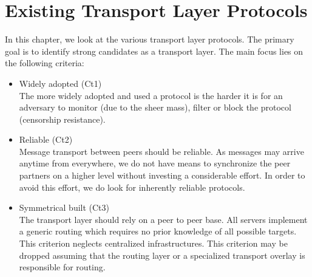 \chapter{Existing Transport Layer Protocols \label{sec:existingTPP}}
In this chapter, we look at the various transport layer protocols. The primary goal is to identify strong candidates as a transport layer. The main focus lies on the following criteria:
\begin{itemize}
	\item Widely adopted (Ct1)\\
	      The more widely adopted and used a protocol is the harder it is for an adversary to monitor (due to the sheer mass), filter or block the protocol (censorship resistance).
	\item Reliable (Ct2)\\
	      Message transport between peers should be reliable. As messages may arrive anytime from everywhere, we do not have means to synchronize the peer partners on a higher level without investing a considerable effort. In order to avoid this effort, we do look for inherently reliable protocols.
	\item Symmetrical built (Ct3)\\
	      The transport layer should rely on a peer to peer base. All servers implement a generic routing which requires no prior knowledge of all possible targets. This criterion neglects centralized infrastructures. This criterion may be dropped assuming that the routing layer or a specialized transport overlay is responsible for routing.
\end{itemize}

